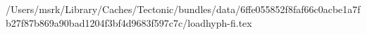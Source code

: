 /Users/msrk/Library/Caches/Tectonic/bundles/data/6ffe055852f8faf66c0acbe1a7fb27f87b869a90bad1204f3bf4d9683f597c7c/loadhyph-fi.tex